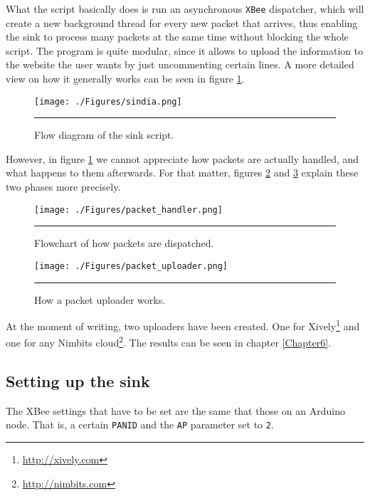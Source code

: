 What the script basically does is run an asynchronous \texttt{XBee} dispatcher, which will create a new background thread for every new packet that arrives, thus enabling the sink to process many packets at the same time without blocking the whole script. The program is quite modular, since it allows to upload the information to the website the user wants by just uncommenting certain lines. A more detailed view on how it generally works can be seen in figure \ref{fig:sindia}.

\begin{figure}[htbp]
    \centering
        \texttt{[image: ./Figures/sindia.png]}
        \rule{35em}{0.5pt}
    \caption[Flow diagram of the sink script]{Flow diagram of the sink script.}
    \label{fig:sindia}
\end{figure}

However, in figure \ref{fig:sindia} we cannot appreciate how packets are actually handled, and what happens to them afterwards. For that matter, figures \ref{fig:phandler} and \ref{fig:puploader} explain these two phases more precisely.

\begin{figure}[htbp]
    \centering
        \texttt{[image: ./Figures/packet\_handler.png]}
        \rule{35em}{0.5pt}
    \caption[Packet dispatcher flowchart]{Flowchart of how packets are dispatched.}
    \label{fig:phandler}
\end{figure}

\begin{figure}[htbp]
    \centering
        \texttt{[image: ./Figures/packet\_uploader.png]}
        \rule{35em}{0.5pt}
    \caption[Packet uploader flowchart]{How a packet uploader works.}
    \label{fig:puploader}
\end{figure}

At the moment of writing, two uploaders have been created. One for Xively\footnote{\url{http://xively.com}} and one for any Nimbits cloud\footnote{\url{http://nimbits.com}}. The results can be seen in chapter \ref{Chapter6}.

\subsection{Setting up the sink}

The XBee\textregistered{} settings that have to be set are the same that those on an Arduino node. That is, a certain \texttt{PANID} and the \texttt{AP} parameter set to \texttt{2}.

